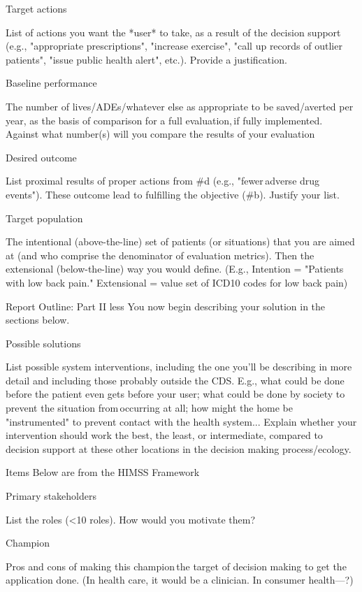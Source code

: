 \documentclass{article}
\begin{document}
Target actions 

List of actions you want the *user* to take, as a result of the decision support (e.g., "appropriate prescriptions", "increase exercise", "call up records of outlier patients", "issue public health alert", etc.). Provide a justification.  

Baseline performance 

The number of lives/ADEs/whatever else as appropriate to be saved/averted per year, as the basis of comparison for a full evaluation, if fully implemented. Against what number(s) will you compare the results of your evaluation 

Desired outcome 

List proximal results of proper actions from #d (e.g., "fewer adverse drug events"). These outcome lead to fulfilling the objective (#b). Justify your list. 

Target population 

The intentional (above-the-line) set of patients (or situations) that you are aimed at (and who comprise the denominator of evaluation metrics). Then the extensional (below-the-line) way you would define. (E.g., Intention = "Patients with low back pain." Extensional = value set of ICD10 codes for low back pain) 

Report Outline: Part II
less 
You now begin describing your solution in the sections below. 

Possible solutions 

List possible system interventions, including the one you’ll be describing in more detail and including those probably outside the CDS. E.g., what could be done before the patient even gets before your user; what could be done by society to prevent the situation from occurring at all; how might the home be "instrumented" to prevent contact with the health system... Explain whether your intervention should work the best, the least, or intermediate, compared to decision support at these other locations in the decision making process/ecology. 

Items Below are from the HIMSS Framework 

Primary stakeholders 

List the roles (<10 roles). How would you motivate them? 

Champion 

Pros and cons of making this champion the target of decision making to get the application done. (In health care, it would be a clinician. In consumer health---?) 
\end{document}
